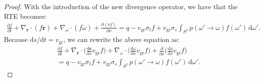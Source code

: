 \documentclass[10pt]{article}
\newcommand{\dee}{\mathrm{d}}
\newcommand{\ve}[1]{\mathbf{#1}}
\newcommand{\ra}{\rightarrow}
\newcommand{\group}{\mathrm{gr}}
\begin{document}
\begin{itemize}
\begin{proof}
      With the introduction of the new divergence operator, we have that the RTE becomes:
      \begin{align*}
        \frac{\partial f}{\partial t}  
        + \nabla_{\ve{r}} \cdot (f \dot{\ve{r}})
        + \nabla_{\omega} \cdot (f \dot{\omega})
        + \frac{\partial (\dot \nu f)}{\partial \nu}
        = q -v_\group \sigma_t f
        +v_\group \sigma_s \int_{S^2} p(\omega' \ra \omega) f(\omega')\, \dee \omega'.
      \end{align*}
      Because $\dee s / \dee t = v_\group$, we can rewrite the above equation as:
      \begin{align*}
        & \frac{\partial f}{\partial t}  
        + \nabla_{\ve{r}} \cdot \bigg( \frac{\dee \ve{r}}{\dee s} v_\group f\bigg)
        + \nabla_{\omega} \cdot \bigg( \frac{\dee \omega}{\dee s} v_\group f \bigg)
        + \frac{\partial}{\partial \nu} \bigg( \frac{\dee \nu}{\dee s} v_\group f \bigg)\\
        &= q -v_\group \sigma_t f
        +v_\group \sigma_s \int_{S^2} p(\omega' \ra \omega) f(\omega')\, \dee \omega'.
      \end{align*}


\end{proof}
\end{itemize}
\end{document}
